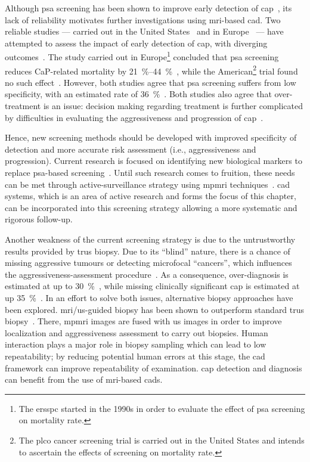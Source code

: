 Although \ac{psa} screening has been shown to improve early detection of
\ac{cap}~\cite{Chou2011}, its lack of reliability motivates further
investigations using \ac{mri}-based \ac{cad}.
Two reliable studies --- carried out in the United States~\cite{Andriole2009}
and in Europe~\cite{Schroeder2012, Hugosson2010} --- have attempted to assess
the impact of early detection of \ac{cap}, with diverging
outcomes~\cite{Chou2011,Heidenreich2013}.
The study carried out in Europe\footnote{The \ac{ersspc} started in the 1990s
  in order to evaluate the effect of \ac{psa} screening on mortality rate.}
concluded that \ac{psa} screening reduces CaP-related mortality by
\SIrange{21}{44}{\percent}~\cite{Schroeder2012, Hugosson2010}, while the
American\footnote{The \ac{plco} cancer screening trial is carried out in the
  United States and intends to ascertain the effects of screening on mortality
  rate.} trial found no such effect~\cite{Andriole2009}.
However, both studies agree that \ac{psa} screening suffers from low
specificity, with an estimated rate of \SI{36}{\percent}~\cite{Schroder2008}.
Both studies also agree that over-treatment is an issue: decision making
regarding treatment is further complicated by difficulties in evaluating the
aggressiveness and progression of \ac{cap}~\cite{Delpierre2013}.

Hence, new screening methods should be developed with improved specificity of
detection and more accurate risk assessment (i.e., aggressiveness and
progression).
Current research is focused on identifying new biological markers to replace
\ac{psa}-based screening~\cite{Bourdoumis2010,Morgan2011,Brenner2013}.
Until such research comes to fruition, these needs can be met through
active-surveillance strategy using \ac{mpmri}
techniques~\cite{Hoeks2011,Moore2013}.
\Ac{cad} systems, which is an area of active research and forms the
focus of this chapter, can be incorporated into this screening strategy allowing
a more systematic and rigorous follow-up.

Another weakness of the current screening strategy is due to the untrustworthy
results provided by \ac{trus} biopsy.
Due to its ``blind'' nature, there is a chance of missing aggressive tumours or
detecting microfocal ``cancers'', which influences the
aggressiveness-assessment procedure~\cite{Noguchi2001}.
As a consequence, over-diagnosis is estimated at up to
\SI{30}{\percent}~\cite{Haas2007}, while missing clinically significant
\ac{cap} is estimated at up \SI{35}{\percent}~\cite{Taira2010}.
In an effort to solve both issues, alternative biopsy approaches have been
explored.
\ac{mri}/\ac{us}-guided biopsy has been shown to outperform standard \ac{trus}
biopsy~\cite{Delongchamps2013}.
There, \ac{mpmri} images are fused with \ac{us} images in order to improve
localization and aggressiveness assessment to carry out biopsies.
Human interaction plays a major role in biopsy sampling which can lead to low
repeatability; by reducing potential human errors at this stage, the \acs{cad}
framework can improve repeatability of examination.
\ac{cap} detection and diagnosis can benefit from the use of \ac{mri}-based
\acs{cad}s.

